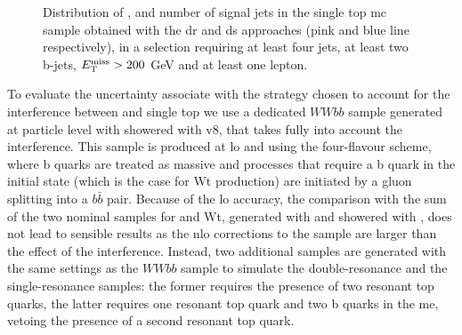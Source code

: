 \begin{figure}[h!]
\centering 
{}
\caption{Distribution of  \met,   \mtb and  number of signal jets in the single top \gls{mc} sample obtained with the \gls{dr} and \gls{ds} approaches (pink and blue line respectively), in a selection requiring at least four jets, at least two b-jets, $E_{\rm T}^{\mathrm{miss}}>200$ GeV and at least one lepton. 
}\label{fig:st_1L}
\end{figure}

To evaluate the uncertainty associate with the strategy chosen to account for the interference between \ttbar and single top
we use a dedicated $WWbb$ sample generated at particle level with \aNLO showered with \PY v8, that takes fully into account the interference.
This sample is produced at \gls{lo} and using the four-flavour scheme, where b quarks are treated as massive and processes that require a b quark in the initial state (which is the case for Wt production) are initiated by a gluon splitting into a $b\bar{b}$ pair. 
Because of the \gls{lo} accuracy, the comparison with the sum of the two nominal samples for \ttbar and Wt, generated with \PowhegBox and showered with \PY, does not lead to sensible 
results as the \gls{nlo} corrections to the \ttbar sample are larger than the effect of the interference. 
Instead, two additional samples are generated with the same settings as the $WWbb$ sample to simulate the double-resonance and the single-resonance samples: the former requires the presence of two resonant top quarks, the latter requires one resonant top quark and two b quarks in the \gls{me}, vetoing the presence of a second resonant top quark.  


